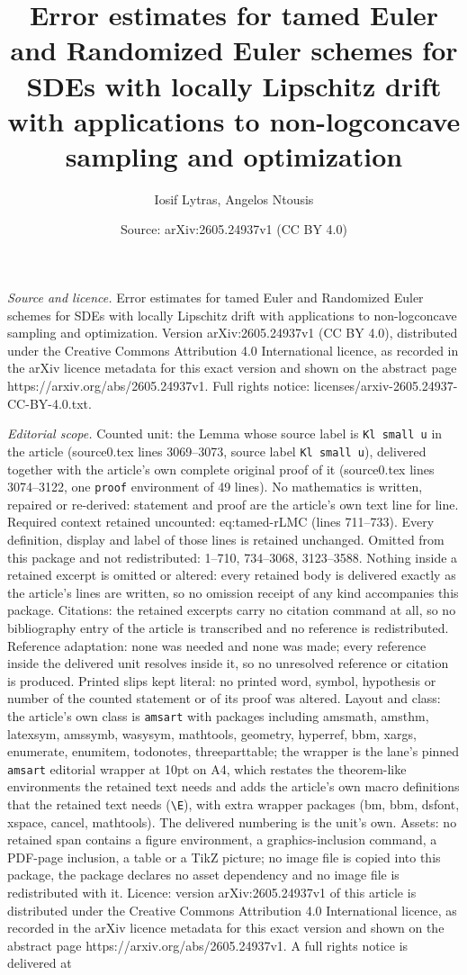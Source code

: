 \documentclass[10pt,a4paper]{amsart}
\title[Error estimates for tamed Euler and Randomized Euler schemes]{Error estimates for tamed Euler and Randomized Euler schemes for SDEs with locally Lipschitz drift with applications to non-logconcave sampling and optimization}
\author{Iosif Lytras, Angelos Ntousis}
\date{Source: arXiv:2605.24937v1 (CC BY 4.0)}
\begin{document}
\maketitle

\noindent\emph{Source and licence.} Error estimates for tamed Euler and Randomized Euler schemes for SDEs with locally Lipschitz drift with applications to non-logconcave sampling and optimization. Version arXiv:2605.24937v1 (CC BY 4.0), distributed under the Creative Commons Attribution 4.0 International licence, as recorded in the arXiv licence metadata for this exact version and shown on the abstract page https://arxiv.org/abs/2605.24937v1. Full rights notice: licenses/arxiv-2605.24937-CC-BY-4.0.txt.\par\smallskip

\noindent\textit{Editorial scope.} Counted unit: the Lemma whose source label is \texttt{Kl small u} in the article (source0.tex lines 3069--3073, source label \texttt{Kl small u}), delivered together with the article's own complete original proof of it (source0.tex lines 3074--3122, one \texttt{proof} environment of 49 lines). No mathematics is written, repaired or re-derived: statement and proof are the article's own text line for line. Required context retained uncounted: eq:tamed-rLMC (lines 711--733). Every definition, display and label of those lines is retained unchanged. Omitted from this package and not redistributed: 1--710, 734--3068, 3123--3588. Nothing inside a retained excerpt is omitted or altered: every retained body is delivered exactly as the article's lines are written, so no omission receipt of any kind accompanies this package. Citations: the retained excerpts carry no citation command at all, so no bibliography entry of the article is transcribed and no reference is redistributed. Reference adaptation: none was needed and none was made; every reference inside the delivered unit resolves inside it, so no unresolved reference or citation is produced. Printed slips kept literal: no printed word, symbol, hypothesis or number of the counted statement or of its proof was altered. Layout and class: the article's own class is \texttt{amsart} with packages including amsmath, amsthm, latexsym, amssymb, wasysym, mathtools, geometry, hyperref, bbm, xargs, enumerate, enumitem, todonotes, threeparttable; the wrapper is the lane's pinned \texttt{amsart} editorial wrapper at 10pt on A4, which restates the theorem-like environments the retained text needs and adds the article's own macro definitions that the retained text needs (\texttt{\textbackslash E}), with extra wrapper packages (bm, bbm, dsfont, xspace, cancel, mathtools). The delivered numbering is the unit's own. Assets: no retained span contains a figure environment, a graphics-inclusion command, a PDF-page inclusion, a table or a TikZ picture; no image file is copied into this package, the package declares no asset dependency and no image file is redistributed with it. Licence: version arXiv:2605.24937v1 of this article is distributed under the Creative Commons Attribution 4.0 International licence, as recorded in the arXiv licence metadata for this exact version and shown on the abstract page https://arxiv.org/abs/2605.24937v1. A full rights notice is delivered at 
\end{document}
